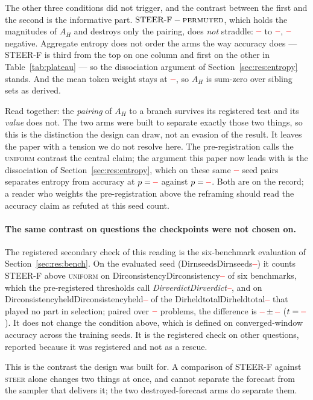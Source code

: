 \documentclass[11pt]{article}
\newcommand{\AH}{A_{H}}
\providecommand{\PENDING}{\textcolor{red}{\textbf{--}}}
\newcommand{\num}[1]{\ifcsname #1\endcsname\csname #1\endcsname\else\PENDING\fi}
\begin{document}
The other three conditions did not trigger, and the contrast between the first and
the second is the informative part. $\text{STEER-F} - \textsc{permuted}$, which
holds the magnitudes of $\AH$ and destroys only the pairing, does \emph{not} straddle:
$\num{CLosignedpermutedacc}$ to $\num{CHisignedpermutedacc}$,
$\num{CNegsignedpermutedacc}$ negative. Aggregate entropy does not order the arms the
way accuracy does --- STEER-F is third from the top on one column and first on the
other in Table~\ref{tab:plateau} --- so the dissociation argument of
Section~\ref{sec:res:entropy} stands. And the mean token weight stays at
$\num{Rsignedtwmean}$, so $\AH$ is sum-zero over sibling sets as derived.

Read together: the \emph{pairing} of $\AH$ to a branch survives its registered test
and its \emph{value} does not. The two arms were built to separate exactly those two
things, so this is the distinction the design can draw, not an evasion of the
result. It leaves the paper with a tension we do not resolve here. The
pre-registration calls the \textsc{uniform} contrast the central claim; the argument
this paper now leads with is the dissociation of Section~\ref{sec:res:entropy}, which
on these same $\num{Nsignedgrpo}$ seed pairs separates entropy from accuracy at
$p = \num{Psignedgrpoentropy}$ against $p = \num{Psignedgrpoacc}$. Both are on the
record; a reader who weights the pre-registration above the reframing should read the
accuracy claim as refuted at this seed count.

\paragraph{The same contrast on questions the checkpoints were not chosen on.} The
registered secondary check of this reading is the six-benchmark evaluation of
Section~\ref{sec:res:bench}. On the evaluated seed (\num{Dirnseeds}) it counts
STEER-F above \textsc{uniform} on \num{Dirconsistency} of six benchmarks, which the
pre-registered thresholds call \emph{\num{Dirverdict}}, and on
\num{Dirconsistencyheld} of the \num{Dirheldtotal} that played no part in selection;
paired over $\num{Pairn}$ problems, the difference is
$\num{Pairsigneduniform} \pm \num{Pairsigneduniformse}$
($t = \num{Pairsigneduniformt}$). It does not change the condition above, which is
defined on converged-window accuracy across the training seeds. It is the registered
check on other questions, reported because it was registered and not as a rescue.

This is the contrast the design was built for. A comparison of STEER-F against
\textsc{steer} alone changes two things at once, and cannot separate the forecast
from the sampler that delivers it; the two destroyed-forecast arms do separate them.
\end{document}
